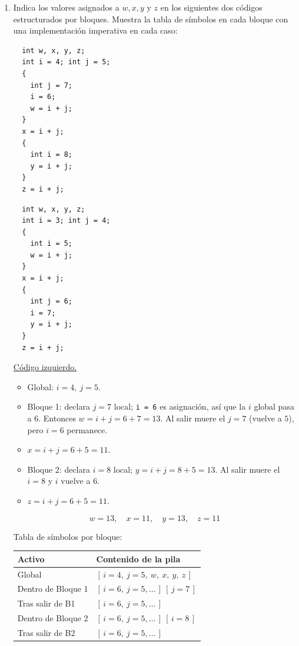 \documentclass[12pt, letterpaper]{article}
\begin{document}
\begin{enumerate}
\item Indica los valores asignados a $w, x, y$ y $z$ en los siguientes dos códigos estructurados por bloques.
  Muestra la tabla de símbolos en cada bloque con una implementación imperativa en cada caso:\\
  
  \begin{minipage}{0.5\textwidth}
    \footnotesize
\begin{verbatim}
  int w, x, y, z;
  int i = 4; int j = 5;
  { 
    int j = 7;
    i = 6;
    w = i + j; 
  } 
  x = i + j;
  {
    int i = 8;
    y = i + j;
  } 
  z = i + j;
\end{verbatim}
  \end{minipage}
  \begin{minipage}{0.5\textwidth}
    \footnotesize
\begin{verbatim}
  int w, x, y, z;
  int i = 3; int j = 4;
  {
    int i = 5;
    w = i + j;
  }
  x = i + j;
  {
    int j = 6;
    i = 7;
    y = i + j;
  }
  z = i + j;
\end{verbatim}
  \end{minipage}

  \noindent\underline{Código izquierdo.}
  \begin{itemize}[nosep]
  \item Global: $i=4,\ j=5$.
  \item Bloque 1: declara $j=7$ local; \texttt{i = 6} es asignación, así que la $i$ global pasa a $6$.
    Entonces $w = i + j = 6 + 7 = 13$. Al salir muere el $j=7$ (vuelve a $5$), pero $i=6$ permanece.
  \item $x = i + j = 6 + 5 = 11$.
  \item Bloque 2: declara $i=8$ local; $y = i + j = 8 + 5 = 13$. Al salir muere el $i=8$ y $i$ vuelve a $6$.
  \item $z = i + j = 6 + 5 = 11$.
  \end{itemize}
  \[ \boxed{w = 13,\quad x = 11,\quad y = 13,\quad z = 11} \]

  Tabla de símbolos por bloque:
  \begin{center}
    \begin{tabular}{ll}
      \toprule
      \textbf{Activo} & \textbf{Contenido de la pila } \\
      \midrule
      Global            & $[\,i{=}4,\ j{=}5,\ w,\ x,\ y,\ z\,]$ \\
      Dentro de Bloque 1 & $[\,i{=}6,\ j{=}5,\dots\,]\ [\,j{=}7\,]$ \\
      Tras salir de B1   & $[\,i{=}6,\ j{=}5,\dots\,]$ \\
      Dentro de Bloque 2 & $[\,i{=}6,\ j{=}5,\dots\,]\ [\,i{=}8\,]$ \\
      Tras salir de B2   & $[\,i{=}6,\ j{=}5,\dots\,]$ \\
      \bottomrule
    \end{tabular}
  \end{center}


\end{enumerate}
\end{document}
